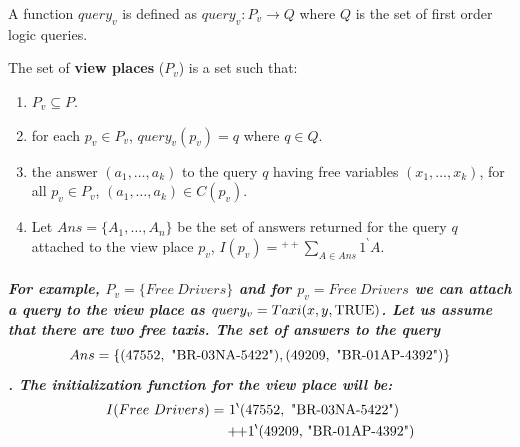 \begin{defs}
	\label{defs:dbn_query_function}
	A function $\mathit{query_{v}}$ is defined as $\mathit{query_{v} : P_{v} \rightarrow Q}$ where $\mathit{Q}$ is the set of first order logic queries.
\end{defs}

\begin{defs}
	\label{defs:dbn_formal_view_place}
	The set of \textbf{view places} ($\mathit{P_{v}}$) is a set such that:
	\begin{enumerate}
		\item $\mathit{P_{v} \subseteq P}$.
		\item for each $\mathit{p_{v} \in P_{v}}$, $\mathit{query_{v}(p_{v}) = q}$ where $\mathit{q \in Q}$.
		\item the answer $\mathit{(a_{1},\ldots,a_{k})}$ to the query $\mathit{q}$ having free variables $\mathit{(x_{1},\ldots,x_{k})}$, for all $\mathit{p_{v} \in P_{v}}$, $\mathit{(a_{1},\ldots,a_{k}) \in C(p_{v})}$.
		\item Let $\mathit{Ans = \{A_{1}, \ldots,A_{n}\}}$ be the set of answers returned for the query $\mathit{q}$ attached to the view place $\mathit{p_{v}}$, $\mathit{I(p_{v}) = {_{}^{++}\sum\limits_{A \in Ans}^{} {1}^{\backprime}A}}$.
	\end{enumerate}
\end{defs}

\subparagraph*{\textnormal{For example, $P_{v} = \{Free \ Drivers\}$ and for $p_{v} = Free \ Drivers$ we can attach a query to the view place as $query_{v} = Taxi(x,y,\textnormal{TRUE})$. Let us assume that there are two free taxis. The set of answers to the query \[Ans = \{(47552,\textnormal{\bdsq{BR-03NA-5422}}), (49209,\textnormal{\bdsq{BR-01AP-4392})}\}\]. The initialization function for the view place will be:
\begin{equation*}
\begin{aligned}
I(Free\ Drivers) =&\ 1^{\backprime} (47552,\textnormal{\bdsq{BR-03NA-5422}})\\
 &+\!\!+ 1^{\backprime} \textnormal{(49209,\bdsq{BR-01AP-4392}})
\end{aligned}
\end{equation*}
}}

